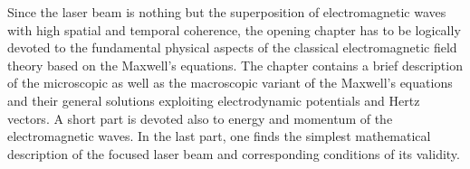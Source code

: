 Since the laser beam is nothing but the superposition of electromagnetic waves with high spatial and temporal coherence, the opening chapter has to be logically devoted to the fundamental physical aspects of the classical electromagnetic field theory based on the Maxwell's equations. The chapter contains a brief description of the microscopic as well as the macroscopic variant of the Maxwell's equations and their general solutions exploiting electrodynamic potentials and Hertz vectors. A short part is devoted also to energy and momentum of the electromagnetic waves. In the last part, one finds the simplest mathematical description of the focused laser beam and corresponding conditions of its validity.